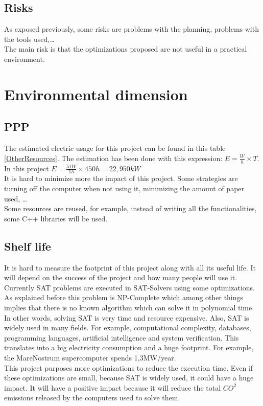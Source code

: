 \subsection{Risks}
As exposed previously, some risks are problems with the planning, problems with the tools used,\ldots\\
The main risk is that the optimizations proposed are not useful in a practical environment. 

\section{Environmental dimension }
\subsection{PPP}
The estimated electric usage for this project can be found in this table \ref{OtherResources}. The estimation has been done with this expression: $E=\frac{W}{h} \times T$. In this project $E=\frac{51W}{1h}\times 450h = 22,950kW$\\

It is hard to minimize more the impact of this project. Some strategies are turning off the computer when not using it, minimizing the amount of paper used, \ldots\\
Some resources are reused, for example, instead of writing all the functionalities, some C++ libraries will be used.
\subsection{Shelf life}
It is hard to measure the footprint of this project along with all its useful life. It will depend on the success of the project and how many people will use it. \\

Currently SAT problems are executed in SAT-Solvers using some optimizations. As explained before this problem is NP-Complete which among other things implies that there is no known algorithm which can solve it in polynomial time. In other words, solving SAT is very time and resource expensive. 
Also, SAT is widely used in many fields. For example, computational complexity, databases, programming languages, artificial intelligence and system verification. This translates into a big electricity consumption and a huge footprint. For example, the MareNostrum\cite{MareNostrum} supercomputer spends 1,3MW/year. \\

This project purposes more optimizations to reduce the execution time. Even if these optimizations are small, because SAT is widely used, it could have a huge impact. It will have a positive impact because it will reduce the total $CO^2$ emissions released by the computers used to solve them.

